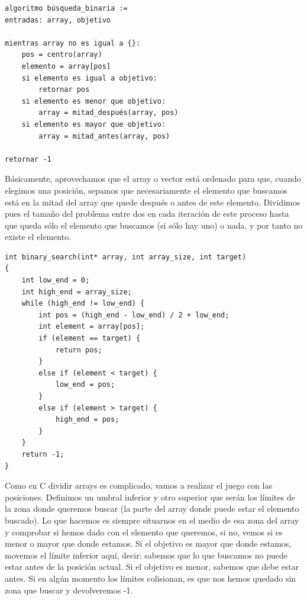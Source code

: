 \documentclass[a4paper]{article}
\begin{document}
\noindent
\begin{minipage}[H]{\linewidth}
\begin{lstlisting}[style=pseudoCode]
algoritmo búsqueda_binaria :=
entradas: array, objetivo

mientras array no es igual a {}:
    pos = centro(array)
    elemento = array[pos]
    si elemento es igual a objetivo:
        retornar pos
    si elemento es menor que objetivo:
        array = mitad_después(array, pos)
    si elemento es mayor que objetivo:
        array = mitad_antes(array, pos)

retornar -1
\end{lstlisting}
\end{minipage}

Básicamente, aprovechamos que el array o vector está ordenado para que, cuando
elegimos una posición, sepamos que necesariamente el elemento que buscamos
está en la mitad del array que quede después o antes de este elemento. Dividimos
pues el tamaño del problema entre dos en cada iteración de este proceso hasta
que queda sólo el elemento que buscamos (si sólo hay uno) o nada, y por tanto
no existe el elemento.


\noindent
\begin{minipage}[H]{\linewidth}
\mbox{}
\begin{lstlisting}[style=C,
caption={Implementación del algoritmo de búsqueda lineal},
label={lst:binarySearch}]
int binary_search(int* array, int array_size, int target)
{
    int low_end = 0;
    int high_end = array_size;
    while (high_end != low_end) {
        int pos = (high_end - low_end) / 2 + low_end;
        int element = array[pos];
        if (element == target) {
            return pos;
        }
        else if (element < target) {
            low_end = pos;
        }
        else if (element > target) {
            high_end = pos;
        }
    }
    return -1;
}
\end{lstlisting}
\end{minipage}

Como en C dividir arrays es complicado, vamos a realizar el juego con las
posiciones. Definimos un umbral inferior y otro superior que serán
los límites de la zona donde queremos buscar (la parte del array donde
puede estar el elemento buscado). Lo que hacemos es siempre situarnos
en el medio de esa zona del array y comprobar si hemos dado con el elemento
que queremos, si no, vemos si es menor o mayor que donde estamos. Si el objetivo
es mayor que donde estamos, movemos el límite inferior aquí,
decir: sabemos que lo que buscamos no puede estar antes de la posición actual.
Si el objetivo es menor, sabemos que debe estar antes. Si en algún momento los
límites colisionan, es que nos hemos quedado sin zona que buscar y devolveremos
-1.
\end{document}
